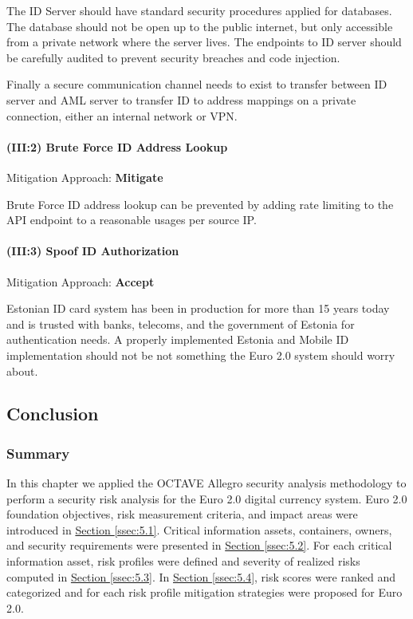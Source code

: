 \documentclass[12pt]{article} %
\newcommand{\hypersectionref}[1]{\hyperref[#1]{Section \ref{#1}}}
\begin{document}
{The ID Server should have standard security procedures applied for databases. The database should not be open up to the public internet, but only accessible from a private network where the server lives. The endpoints to ID server should be carefully audited to prevent security breaches and code injection.

Finally a secure communication channel needs to exist to transfer between ID server and AML server to transfer ID to address mappings on a private connection, either an internal network or VPN.

\paragraph{(III:2) Brute Force ID Address Lookup}

Mitigation Approach: \textbf{Mitigate}

Brute Force ID address lookup can be prevented by adding rate limiting to the API endpoint to a reasonable usages per source IP.

\paragraph{(III:3) Spoof ID Authorization}

Mitigation Approach: \textbf{Accept}

Estonian ID card system has been in production for more than 15 years today and is trusted with banks, telecoms, and the government of Estonia for authentication needs\cite{Martens2010electronicIdentity}. A properly implemented Estonia and Mobile ID implementation should not be not something the Euro 2.0 system should worry about.

\subsection{Conclusion} \label{ssec:5.5}

\subsubsection{Summary} \label{ssec:5.5:summary}
In this chapter we applied the OCTAVE Allegro security analysis methodology\cite{CaralliIntroducingOCTAVE2007} to perform a security risk analysis for the Euro 2.0 digital currency system. Euro 2.0 foundation objectives, risk measurement criteria, and impact areas were introduced in \hypersectionref{ssec:5.1}. Critical information assets, containers, owners, and security requirements were presented in \hypersectionref{ssec:5.2}. For each critical information asset, risk profiles were defined and severity of realized risks computed in \hypersectionref{ssec:5.3}. In \hypersectionref{ssec:5.4}, risk scores were ranked and categorized and for each  risk profile mitigation strategies were proposed for Euro 2.0.

}
\end{document}
